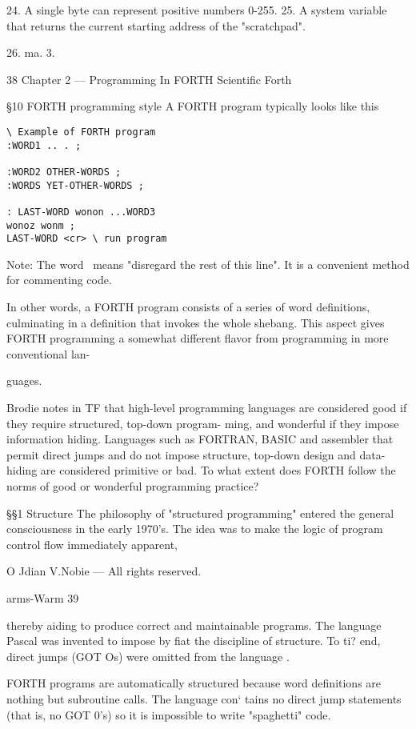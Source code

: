  

24. A single byte can represent positive numbers 0-255.
25. A system variable that returns the current starting address of the "scratchpad".

26. ma. 3.

38 Chapter 2 — Programming In FORTH Scientific Forth

§10 FORTH programming style
A FORTH program typically looks like this

\begin{lstlisting}
\ Example of FORTH program
:WORD1 .. . ;

:WORD2 OTHER-WORDS ;
:WORDS YET-OTHER-WORDS ;

: LAST-WORD wonon ...WORD3
wonoz wonm ;
LAST-WORD <cr> \ run program
\end{lstlisting}

Note: The word \ means "disregard the rest of this line". It is a
convenient method for commenting code.

In other words, a FORTH program consists of a series of word
definitions, culminating in a definition that invokes the whole
shebang. This aspect gives FORTH programming a somewhat
different ﬂavor from programming in more conventional lan-

guages.

Brodie notes in TF that high-level programming languages are
considered good if they require structured, top-down program-
ming, and wonderful if they impose information hiding. Languages
such as FORTRAN, BASIC and assembler that permit direct
jumps and do not impose structure, top-down design and data-
hiding are considered primitive or bad. To what extent does
FORTH follow the norms of good or wonderful programming
practice?

§§1 Structure
The philosophy of "structured programming" entered the
general consciousness in the early 1970’s. The idea was to
make the logic of program control flow immediately apparent,

O Jdian V.Nobie — All rights reserved.

arms-Warm 39

thereby aiding to produce correct and maintainable programs.
The language Pascal was invented to impose by fiat the discipline
of structure. To ti? end, direct jumps (GOT Os) were omitted
from the language .

FORTH programs are automatically structured because word
definitions are nothing but subroutine calls. The language con‘
tains no direct jump statements (that is, no GOT 0's) so it is
impossible to write "spaghetti" code.

